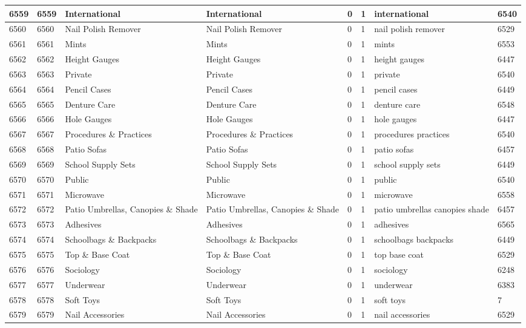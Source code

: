 \begin{longtable}{|l|l|l|l|l|l|l|l|}
6559 & 6559 & International & International & 0 & 1 & international & 6540 \\ \hline 
6560 & 6560 & Nail Polish Remover & Nail Polish Remover & 0 & 1 & nail polish remover & 6529 \\ \hline 
6561 & 6561 & Mints & Mints & 0 & 1 & mints & 6553 \\ \hline 
6562 & 6562 & Height Gauges & Height Gauges & 0 & 1 & height gauges & 6447 \\ \hline 
6563 & 6563 & Private & Private & 0 & 1 & private & 6540 \\ \hline 
6564 & 6564 & Pencil Cases & Pencil Cases & 0 & 1 & pencil cases & 6449 \\ \hline 
6565 & 6565 & Denture Care & Denture Care & 0 & 1 & denture care & 6548 \\ \hline 
6566 & 6566 & Hole Gauges & Hole Gauges & 0 & 1 & hole gauges & 6447 \\ \hline 
6567 & 6567 & Procedures \& Practices & Procedures \& Practices & 0 & 1 & procedures practices & 6540 \\ \hline 
6568 & 6568 & Patio Sofas & Patio Sofas & 0 & 1 & patio sofas & 6457 \\ \hline 
6569 & 6569 & School Supply Sets & School Supply Sets & 0 & 1 & school supply sets & 6449 \\ \hline 
6570 & 6570 & Public & Public & 0 & 1 & public & 6540 \\ \hline 
6571 & 6571 & Microwave & Microwave & 0 & 1 & microwave & 6558 \\ \hline 
6572 & 6572 & Patio Umbrellas, Canopies \& Shade & Patio Umbrellas, Canopies \& Shade & 0 & 1 & patio umbrellas canopies shade & 6457 \\ \hline 
6573 & 6573 & Adhesives & Adhesives & 0 & 1 & adhesives & 6565 \\ \hline 
6574 & 6574 & Schoolbags \& Backpacks & Schoolbags \& Backpacks & 0 & 1 & schoolbags backpacks & 6449 \\ \hline 
6575 & 6575 & Top \& Base Coat & Top \& Base Coat & 0 & 1 & top base coat & 6529 \\ \hline 
6576 & 6576 & Sociology & Sociology & 0 & 1 & sociology & 6248 \\ \hline 
6577 & 6577 & Underwear & Underwear & 0 & 1 & underwear & 6383 \\ \hline 
6578 & 6578 & Soft Toys & Soft Toys & 0 & 1 & soft toys & 7 \\ \hline 
6579 & 6579 & Nail Accessories & Nail Accessories & 0 & 1 & nail accessories & 6529 \\ \hline 

\end{longtable}
